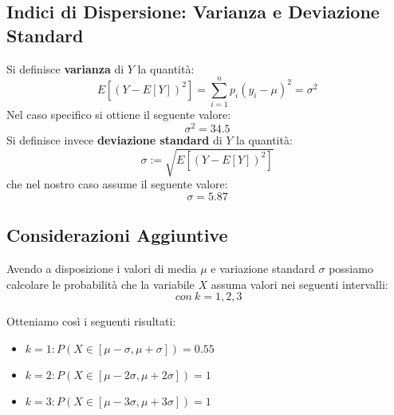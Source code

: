 \subsection{Indici di Dispersione: Varianza e Deviazione Standard}
Si definisce \textbf{varianza} di $Y$ la quantità:
\begin{equation}
    E[(Y-E[Y])^2]= \sum_{i=1}^{n}p_i(y_i - \mu)^2 = \sigma^2
\end{equation}
Nel caso specifico si ottiene il seguente valore:
\begin{equation}
    \sigma^2= 34.5
\end{equation}
Si definisce invece \textbf{deviazione standard} di $Y$ la quantità:
\begin{equation}
    \sigma := \sqrt{E[(Y-E[Y])^2]}
\end{equation}
che nel nostro caso assume il seguente valore:
\begin{equation}
    \sigma = 5.87
\end{equation}

\subsection{Considerazioni Aggiuntive}
Avendo a disposizione i valori di media $\mu$ e variazione standard $\sigma$ possiamo calcolare le probabilità che la variabile $X$ assuma valori nei seguenti intervalli:
\begin{equation*}
	[\mu-k\sigma, \mu+k\sigma]\ con\ k=1,2,3
\end{equation*} 

Otteniamo così i seguenti risultati:
\begin{itemize}
    \item $k=1: P(X \in [\mu-\sigma, \mu+\sigma]) = 0.55$
    \item $k=2: P(X \in [\mu-2\sigma, \mu+2\sigma]) = 1$
    \item $k=3: P(X \in [\mu-3\sigma, \mu+3\sigma]) = 1$
\end{itemize}

